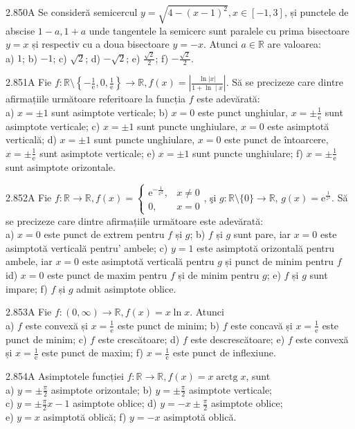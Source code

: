 \documentclass[11pt]{article}
\begin{document}
2.850A Se consideră semicercul $y=\sqrt{4-(x-1)^{2}}, x \in[-1,3]$, și punctele de abscise $1-a, 1+a$ unde tangentele la semicerc sunt paralele cu prima bisectoare $y=x$ și respectiv cu a doua bisectoare $y=-x$. Atunci $a \in \mathbb{R}$ are valoarea:\\ a) $1$; b) $-1$; c) $\sqrt{2}$; d) $-\sqrt{2}$; e) $\frac{\sqrt{2}}{2}$; f) $-\frac{\sqrt{2}}{2}$.

2.851A Fie $f: \mathbb{R} \setminus\left\{-\frac{1}{\mathrm{e}}, 0, \frac{1}{\mathrm{e}}\right\} \rightarrow \mathbb{R}, f(x)=\left|\frac{\ln |x|}{1+\ln \mid x}\right|$. Să se precizeze care dintre afirmațiile următoare referitoare la funcția $f$ este adevărată:\\ a) $x= \pm 1$ sunt asimptote verticale; b) $x=0$ este punct unghiular, $x= \pm \frac{1}{\mathrm{e}}$ sunt asimptote verticale; c) $x= \pm 1$ sunt puncte unghiulare, $x=0$ este asimptotă verticală; d) $x= \pm 1$ sunt puncte unghiulare, $x=0$ este punct de întoarcere, $x= \pm \frac{1}{\mathrm{e}}$ sunt asimptote verticale; e) $x= \pm 1$ sunt puncte unghiulare; f) $x= \pm \frac{1}{\mathrm{e}}$ sunt asimptote orizontale.

2.852A Fie $f: \mathbb{R} \rightarrow \mathbb{R}, f(x)=\left\{\begin{array}{ll}\mathrm{e}^{-\frac{1}{x^{2}}}, & x \neq 0 \\ 0, & x=0\end{array}\right.$, şi $g: \mathbb{R} \setminus\{0\} \rightarrow \mathbb{R}$, $g(x)=\mathrm{e}^{\frac{1}{z^{2}}}$. Să se precizeze care dintre afirmațiile următoare este adevărată:\\ a) $x=0$ este punct de extrem pentru $f$ și $g$; b) $f$ și $g$ sunt pare, iar $x=0$ este asimptotă verticală pentru' ambele; c) $y=1$ este asimptotă orizontală pentru ambele, iar $x=0$ este asimptotă verticală pentru $g$ și punct de minim pentru $f$ id) $x=0$ este punct de maxim pentru $f$ și de minim pentru $g$; e) $f$ și $g$ sunt impare; f) $f$ și $g$ admit asimptote oblice.

2.853A Fie $f:(0, \infty) \rightarrow \mathbb{R}, f(x)=x \ln x$. Atunci\\ a) $f$ este convexă și $x=\frac{1}{\mathrm{e}}$ este punct de minim; b) $f$ este concavă și $x=\frac{1}{\mathrm{e}}$ este punct de minim; c) $f$ este crescătoare; d) $f$ este descrescătoare; e) $f$ este convexă și $x=\frac{1}{\mathrm{e}}$ este punct de maxim; f) $x=\frac{1}{\mathrm{e}}$ este punct de inflexiune.

2.854A Asimptotele funcției $f: \mathbb{R} \rightarrow \mathbb{R}, f(x)=x \operatorname{arctg} x$, sunt\\ a) $y= \pm \frac{\pi}{2}$ asimptote orizontale; b) $y= \pm \frac{\pi}{2}$ asimptote verticale;\\ c) $y= \pm \frac{\pi}{2} x-1$ asimptote oblice; d) $y=-x \pm \frac{\pi}{2}$ asimptote oblice;\\ e) $y=x$ asimptotă oblică; f) $y=-x$ asimptotă oblică.
\end{document}

